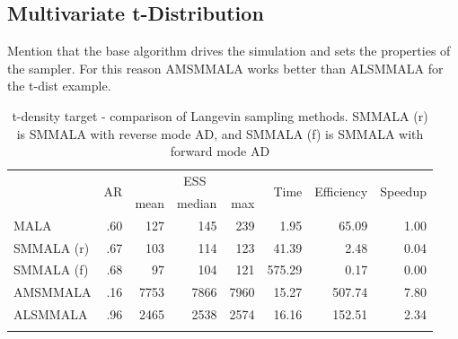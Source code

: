 \documentclass[twoside,11pt]{article}
\begin{document}
\subsection{Multivariate t-Distribution}

Mention that the base algorithm drives the simulation and sets the properties of the sampler. For this reason AMSMMALA works
better than ALSMMALA for the t-dist example.

\begin{table}
	\caption{t-density target - comparison of Langevin sampling methods. SMMALA (r) is SMMALA with reverse mode AD, and 
	SMMALA (f) is SMMALA with forward mode AD}
	\label{tab:t}
	\begin{tabular}{l|r|rrr|r|r|r}
		\hline\noalign{\smallskip}
		\multirow{2}{*}{Method} &
		\multirow{2}{*}{AR} &
		\multicolumn{3}{c|}{ESS} &
		\multirow{2}{*}{Time} &
		\multirow{2}{*}{Efficiency} &
		\multirow{2}{*}{Speedup} \\
		& & mean & median & max & & & \\
		\noalign{\smallskip}\hline\noalign{\smallskip}
		MALA & .60 & 127 & 145 & 239 & 1.95 & 65.09 & 1.00 \\
		SMMALA (r) & .67 & 103 & 114 & 123 & 41.39 & 2.48 & 0.04 \\
		SMMALA (f) & .68 & 97 & 104 & 121 & 575.29 & 0.17 & 0.00 \\
		AMSMMALA & .16 & 7753 & 7866 & 7960 & 15.27 & 507.74 & 7.80 \\
		ALSMMALA & .96 & 2465 & 2538 & 2574 & 16.16 & 152.51 & 2.34 \\	
		\noalign{\smallskip}\hline
	\end{tabular}
\end{table}
\end{document}
